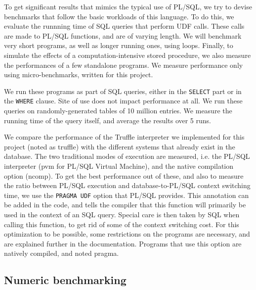 \documentclass[twoside,11pt,a4paper]{article}
\newcommand{\sql}[1]{\texttt{#1}}
\newcommand{\pls}[1]{\small\texttt{#1}\normalsize}
\newcommand{\benchsystem}[1]{\textsf{#1}}
\newcommand{\pvm}{\benchsystem{pvm}}
\newcommand{\ncomp}{\benchsystem{ncomp}}
\newcommand{\ncpg}{\benchsystem{pragma}}
\newcommand{\truffle}{\benchsystem{truffle}}
\begin{document}
To get significant results that mimics the typical use of PL/SQL, we try to devise benchmarks that follow the basic workloads of this language. To do this, we evaluate the runnning time of SQL queries that perform UDF calls. These calls are made to PL/SQL functions, and are of varying length. We will benchmark very short programs, as well as longer running ones, using loops. Finally, to simulate the effects of a computation-intensive stored procedure, we also measure the performances of a few standalone programs. We measure performance only using micro-benchmarks, written for this project.


We run these programs as part of SQL queries, either in the \sql{SELECT} part or in the \sql{WHERE} clause. Site of use does not impact performance at all. We run these queries on randomly-generated tables of 10 million entries. We measure the running time of the query itself, and average the results over 5 runs.

We compare the performance of the Truffle interpreter we implemented for this project (noted as \truffle{}) with the different systems that already exist in the database. The two traditional modes of execution are measured, i.e. the PL/SQL interpreter (\pvm{} for PL/SQL Virtual Machine), and the native compilation option (\ncomp{}). To get the best performance out of these, and also to measure the ratio between PL/SQL execution and database-to-PL/SQL context switching time, we use the \pls{PRAGMA UDF} option that PL/SQL provides. This annotation can be added in the code, and tells the compiler that this function will primarily be used in the context of an SQL query. Special care is then taken by SQL when calling this function, to get rid of some of the context switching cost. For this optimization to be possible, some restrictions on the programs are necessary, and are explained further in the documentation. Programs that use this option are natively compiled, and noted \ncpg{}.

\subsection{Numeric benchmarking}
\end{document}
